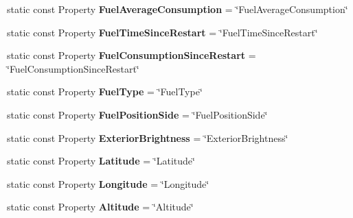 \begin{DoxyCompactItemize}
\item 
\hypertarget{classVehicleProperty_add43436a1abdac3e56d4bac9ad0f919f}{static const Property {\bfseries Fuel\-Average\-Consumption} = \char`\"{}Fuel\-Average\-Consumption\char`\"{}}\label{classVehicleProperty_add43436a1abdac3e56d4bac9ad0f919f}

\item 
\hypertarget{classVehicleProperty_ac0a8562820cc38f78d806cba49372ed9}{static const Property {\bfseries Fuel\-Time\-Since\-Restart} = \char`\"{}Fuel\-Time\-Since\-Restart\char`\"{}}\label{classVehicleProperty_ac0a8562820cc38f78d806cba49372ed9}

\item 
\hypertarget{classVehicleProperty_a7d6a9cf70c023922f792c3ce7c0b0db0}{static const Property {\bfseries Fuel\-Consumption\-Since\-Restart} = \char`\"{}Fuel\-Consumption\-Since\-Restart\char`\"{}}\label{classVehicleProperty_a7d6a9cf70c023922f792c3ce7c0b0db0}

\item 
\hypertarget{classVehicleProperty_a2df3b5ff14ec4a92fba65ad72be7d5b7}{static const Property {\bfseries Fuel\-Type} = \char`\"{}Fuel\-Type\char`\"{}}\label{classVehicleProperty_a2df3b5ff14ec4a92fba65ad72be7d5b7}

\item 
\hypertarget{classVehicleProperty_a574a971800258aa3d53126ec01e85477}{static const Property {\bfseries Fuel\-Position\-Side} = \char`\"{}Fuel\-Position\-Side\char`\"{}}\label{classVehicleProperty_a574a971800258aa3d53126ec01e85477}

\item 
\hypertarget{classVehicleProperty_a490658c5e633ab54a5bbf11b5f38e994}{static const Property {\bfseries Exterior\-Brightness} = \char`\"{}Exterior\-Brightness\char`\"{}}\label{classVehicleProperty_a490658c5e633ab54a5bbf11b5f38e994}

\item 
\hypertarget{classVehicleProperty_a225bcbd3adba51c5d571a086a98f6b4f}{static const Property {\bfseries Latitude} = \char`\"{}Latitude\char`\"{}}\label{classVehicleProperty_a225bcbd3adba51c5d571a086a98f6b4f}

\item 
\hypertarget{classVehicleProperty_ac5565746cd2dfd2e3f8870d8e292b392}{static const Property {\bfseries Longitude} = \char`\"{}Longitude\char`\"{}}\label{classVehicleProperty_ac5565746cd2dfd2e3f8870d8e292b392}

\item 
\hypertarget{classVehicleProperty_a0411474f4450758ba2dbcdc136ef7391}{static const Property {\bfseries Altitude} = \char`\"{}Altitude\char`\"{}}\label{classVehicleProperty_a0411474f4450758ba2dbcdc136ef7391}


\end{DoxyCompactItemize}
